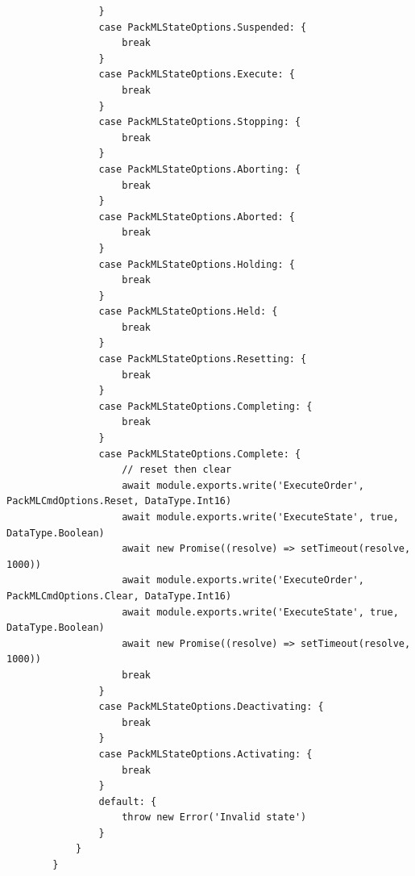 \begin{center}
\begin{verbatim}
                }
                case PackMLStateOptions.Suspended: {
                    break
                }
                case PackMLStateOptions.Execute: {
                    break
                }
                case PackMLStateOptions.Stopping: {
                    break
                }
                case PackMLStateOptions.Aborting: {
                    break
                }
                case PackMLStateOptions.Aborted: {
                    break
                }
                case PackMLStateOptions.Holding: {
                    break
                }
                case PackMLStateOptions.Held: {
                    break
                }
                case PackMLStateOptions.Resetting: {
                    break
                }
                case PackMLStateOptions.Completing: {
                    break
                }
                case PackMLStateOptions.Complete: {
                    // reset then clear
                    await module.exports.write('ExecuteOrder', PackMLCmdOptions.Reset, DataType.Int16)
                    await module.exports.write('ExecuteState', true, DataType.Boolean)
                    await new Promise((resolve) => setTimeout(resolve, 1000))
                    await module.exports.write('ExecuteOrder', PackMLCmdOptions.Clear, DataType.Int16)
                    await module.exports.write('ExecuteState', true, DataType.Boolean)
                    await new Promise((resolve) => setTimeout(resolve, 1000))
                    break
                }
                case PackMLStateOptions.Deactivating: {
                    break
                }
                case PackMLStateOptions.Activating: {
                    break
                }
                default: {
                    throw new Error('Invalid state')
                }
            }
        }

    \end{verbatim}
\end{center}

\newpage
